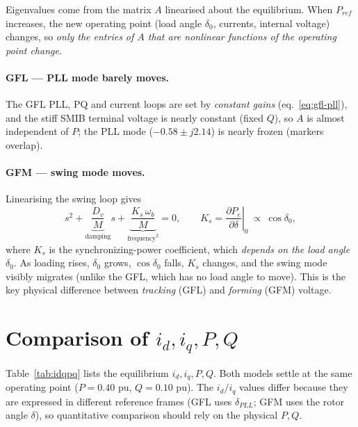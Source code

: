 \documentclass[12pt,a4paper]{article}
\begin{document}
Eigenvalues come from the matrix $A$ linearised about the equilibrium. When $P_{ref}$
increases, the new operating point (load angle $\delta_0$, currents, internal voltage)
changes, so \emph{only the entries of $A$ that are nonlinear functions of the operating
point change}.

\paragraph{GFL --- PLL mode barely moves.} The GFL PLL, PQ and current loops are set by
\emph{constant gains} (eq.~\ref{eq:gfl-pll}), and the stiff SMIB terminal voltage is
nearly constant (fixed $Q$), so $A$ is almost independent of $P$; the PLL mode
($-0.58\pm j2.14$) is nearly frozen (markers overlap).

\paragraph{GFM --- swing mode moves.} Linearising the swing loop gives
\begin{equation}
s^2+\underbrace{\frac{D_v}{M}}_{\text{damping}}s+\underbrace{\frac{K_s\,\omega_b}{M}}_{\text{frequency}^2}=0,
\qquad K_s=\left.\frac{\partial P_e}{\partial\delta}\right|_0\ \propto\ \cos\delta_0,
\label{eq:swingchar}
\end{equation}
where $K_s$ is the synchronizing-power coefficient, which \emph{depends on the load
angle} $\delta_0$. As loading rises, $\delta_0$ grows, $\cos\delta_0$ falls, $K_s$
changes, and the swing mode visibly migrates (unlike the GFL, which has no load angle to
move). This is the key physical difference between \emph{tracking} (GFL) and
\emph{forming} (GFM) voltage.

\section{Comparison of $i_d,i_q,P,Q$}

Table~\ref{tab:idqpq} lists the equilibrium $i_d,i_q,P,Q$. Both models settle at the
same operating point ($P=0.40$ pu, $Q=0.10$ pu). The $i_d/i_q$ values differ because
they are expressed in different reference frames (GFL uses $\delta_{PLL}$; GFM uses the
rotor angle $\delta$), so quantitative comparison should rely on the physical $P,Q$.

\begin{table}[H]\centering\small
\caption{Equilibrium $i_d,i_q,P,Q$ of the two models ($P,Q$ on system base)}
\label{tab:idqpq}

\end{table}
\end{document}
